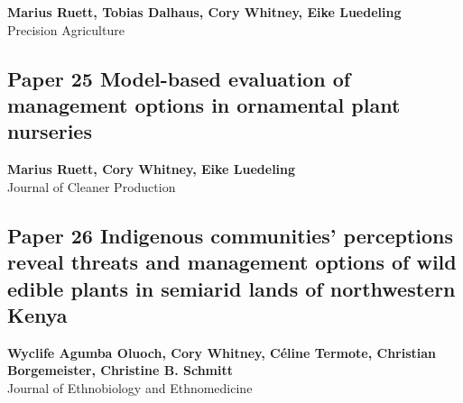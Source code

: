 \documentclass[
]{article}
\begin{document}
\begin{center}
\vspace*{2cm}
{\Large \textbf{Marius Ruett, Tobias Dalhaus, Cory Whitney, Eike Luedeling}} \\[0.5cm]
\vspace*{1cm}
{\Large Precision Agriculture} \\[2cm]
\end{center}


\newpage

\hypertarget{ruett_model-based_2020}{%
\subsection{Paper 25 Model-based evaluation of management options in
ornamental plant nurseries}\label{ruett_model-based_2020}}

\begin{center}
\vspace*{2cm}
{\Large \textbf{Marius Ruett, Cory Whitney, Eike Luedeling}} \\[0.5cm]
\vspace*{1cm}
{\Large Journal of Cleaner Production} \\[2cm]
\end{center}


\newpage

\hypertarget{oluoch_indigenous_2023}{%
\subsection{Paper 26 Indigenous communities' perceptions reveal threats
and management options of wild edible plants in semiarid lands of
northwestern Kenya}\label{oluoch_indigenous_2023}}

\begin{center}
\vspace*{2cm}
{\Large \textbf{Wyclife Agumba Oluoch, Cory Whitney, Céline Termote, Christian Borgemeister, Christine B. Schmitt}} \\[0.5cm]
\vspace*{1cm}
{\Large Journal of Ethnobiology and Ethnomedicine} \\[2cm]
\end{center}

\end{document}

